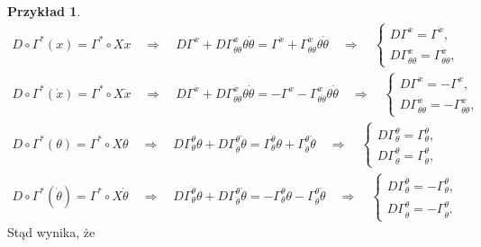 \documentclass[11pt,a4paper]{report}
\theoremstyle{definition}
\newtheorem{example}[theorem]{Przykład}
\begin{document}
\begin{example}
	\begin{equation*}
		\begin{gathered}
			D\circ\Gamma^*(x)=\Gamma^*\circ Xx\quad \Longrightarrow\quad D\Gamma^x+D\Gamma^x_{\theta\dot\theta}\theta\dot\theta =\Gamma^{\dot x}+\Gamma^{\dot x}_{\theta\dot\theta}\theta\dot\theta\quad \Longrightarrow\quad \left\{ \begin{array}{l}
			D\Gamma^x=\Gamma^{\dot x}, \\
			D\Gamma_{\theta\dot\theta}^x=\Gamma_{\theta\dot\theta}^{\dot x}, \end{array} \right. \\
			D\circ \Gamma^*(\dot x) =\Gamma^*\circ X\dot x\quad \Longrightarrow\quad D\Gamma^{\dot x}+D\Gamma^{\dot x}_{\theta\dot\theta}\theta\dot\theta =-\Gamma^{x}-\Gamma^{x}_{\theta\dot\theta} \theta \dot \theta \quad \Longrightarrow\quad \left\{ \begin{array}{l}
			D\Gamma^{\dot x}=-\Gamma^{x}, \\
			D\Gamma_{\theta\dot\theta}^{\dot x} = -\Gamma_{\theta \dot \theta}^{x}, \end{array} \right. \\
			D\circ \Gamma^*(\theta)=\Gamma^*\circ X\theta\quad \Longrightarrow\quad  D\Gamma^\theta_\theta\theta+D\Gamma^\theta_{\dot\theta}\dot\theta =\Gamma^{\dot \theta}_{\theta}\theta+\Gamma^{\dot \theta}_{\dot\theta}\dot \theta\quad \Longrightarrow\quad \left\{ \begin{array}{l}
			D\Gamma^\theta_\theta=\Gamma^{\dot\theta}_\theta, \\
			D\Gamma^\theta_{\dot\theta}=\Gamma^{\theta}_{\dot\theta}, \end{array} \right. \\
			D\circ \Gamma^*(\dot \theta)=\Gamma^*\circ X\dot \theta\quad \Longrightarrow\quad D\Gamma^{\dot \theta}_\theta\theta+D\Gamma^{\dot \theta}_{\dot\theta}\dot \theta=-\Gamma^{\theta}_\theta\theta-\Gamma^{\theta}_{\dot\theta}\dot\theta\quad \Longrightarrow\quad \left\{ \begin{array}{l}
			D\Gamma^{\dot \theta}_\theta=-\Gamma^{\theta}_\theta, \\
			D\Gamma^{\dot\theta}_{\dot \theta}=-\Gamma_{\dot\theta}^{\theta}. \end{array} \right.
		\end{gathered}
	\end{equation*}
	Stąd wynika, że
	\begin{equation}
		\label{eq:superflow_coeff_conditions}
		\begin{gathered}

\end{gathered}
\end{equation}
\end{example}
\end{document}
